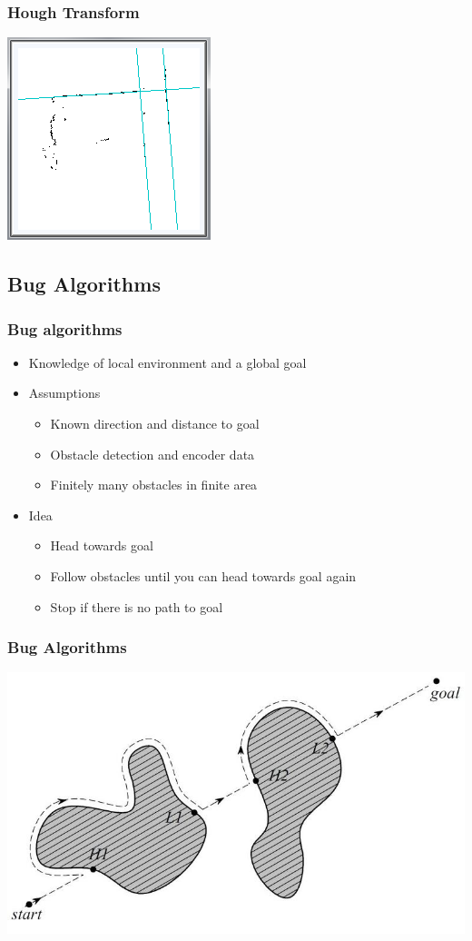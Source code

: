 \documentclass{beamer}
\begin{document}
\begin{frame}
\frametitle{Hough Transform}
\includegraphics[scale=0.7]{assets/images/HoughTransform.png}
\end{frame}

\subsection{Bug Algorithms}
\begin{frame}
\frametitle{Bug algorithms}
\begin{itemize}
\item Knowledge of local environment and a global goal
\item Assumptions
\begin{itemize}
\item Known direction and distance to goal
\item Obstacle detection and encoder data
\item Finitely many obstacles in finite area
\end{itemize}
\item Idea
\begin{itemize}
\item Head towards goal
\item Follow obstacles until you can head towards goal again
\item Stop if there is no path to goal
\end{itemize}
\end{itemize}
\end{frame}

\begin{frame}
\frametitle{Bug Algorithms}
\includegraphics[scale=1]{assets/images/BugAlgorithms.jpg}
\end{frame}
\end{document}
